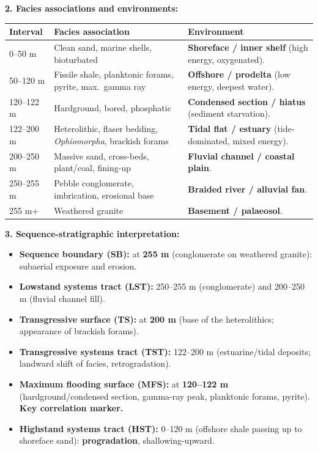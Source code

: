 \documentclass[11pt]{article}
\begin{document}
\begin{exoresolu}
\textbf{2. Facies associations and environments:}

\begin{center}
\begin{tabularx}{\linewidth}{|l|X|X|}\hline
\rowcolor{popblueL}\textbf{Interval} & \textbf{Facies association} & \textbf{Environment} \\ \hline
0--50 m & Clean sand, marine shells, bioturbated & \textbf{Shoreface / inner shelf} (high energy, oxygenated). \\ \hline
50--120 m & Fissile shale, planktonic forams, pyrite, max.\ gamma ray & \textbf{Offshore / prodelta} (low energy, deepest water). \\ \hline
120--122 m & Hardground, bored, phosphatic & \textbf{Condensed section / hiatus} (sediment starvation). \\ \hline
122--200 m & Heterolithic, flaser bedding, \emph{Ophiomorpha}, brackish forams & \textbf{Tidal flat / estuary} (tide-dominated, mixed energy). \\ \hline
200--250 m & Massive sand, cross-beds, plant/coal, fining-up & \textbf{Fluvial channel / coastal plain}. \\ \hline
250--255 m & Pebble conglomerate, imbrication, erosional base & \textbf{Braided river / alluvial fan}. \\ \hline
255 m+ & Weathered granite & \textbf{Basement / palaeosol}. \\ \hline
\end{tabularx}
\end{center}

\textbf{3. Sequence-stratigraphic interpretation:}
\begin{itemize}
    \item \textbf{Sequence boundary (SB):} at \textbf{255 m} (conglomerate on weathered granite): subaerial exposure and erosion.
    \item \textbf{Lowstand systems tract (LST):} 250--255 m (conglomerate) and 200--250 m (fluvial channel fill).
    \item \textbf{Transgressive surface (TS):} at \textbf{200 m} (base of the heterolithics; appearance of brackish forams).
    \item \textbf{Transgressive systems tract (TST):} 122--200 m (estuarine/tidal deposits; landward shift of facies, retrogradation).
    \item \textbf{Maximum flooding surface (MFS):} at \textbf{120--122 m} (hardground/condensed section, gamma-ray peak, planktonic forams, pyrite). \textbf{Key correlation marker.}
    \item \textbf{Highstand systems tract (HST):} 0--120 m (offshore shale passing up to shoreface sand): \textbf{progradation}, shallowing-upward.
\end{itemize}


\end{exoresolu}
\end{document}
